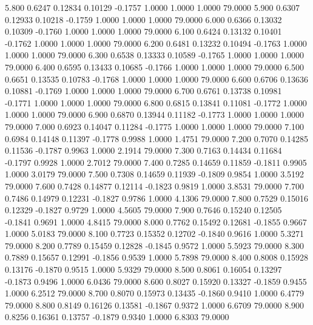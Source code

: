    5.800   0.6247   0.12834   0.10129  -0.1757   1.0000   1.0000   1.0000  79.0000
   5.900   0.6307   0.12933   0.10218  -0.1759   1.0000   1.0000   1.0000  79.0000
   6.000   0.6366   0.13032   0.10309  -0.1760   1.0000   1.0000   1.0000  79.0000
   6.100   0.6424   0.13132   0.10401  -0.1762   1.0000   1.0000   1.0000  79.0000
   6.200   0.6481   0.13232   0.10494  -0.1763   1.0000   1.0000   1.0000  79.0000
   6.300   0.6538   0.13333   0.10589  -0.1765   1.0000   1.0000   1.0000  79.0000
   6.400   0.6595   0.13433   0.10685  -0.1766   1.0000   1.0000   1.0000  79.0000
   6.500   0.6651   0.13535   0.10783  -0.1768   1.0000   1.0000   1.0000  79.0000
   6.600   0.6706   0.13636   0.10881  -0.1769   1.0000   1.0000   1.0000  79.0000
   6.700   0.6761   0.13738   0.10981  -0.1771   1.0000   1.0000   1.0000  79.0000
   6.800   0.6815   0.13841   0.11081  -0.1772   1.0000   1.0000   1.0000  79.0000
   6.900   0.6870   0.13944   0.11182  -0.1773   1.0000   1.0000   1.0000  79.0000
   7.000   0.6923   0.14047   0.11284  -0.1775   1.0000   1.0000   1.0000  79.0000
   7.100   0.6984   0.14148   0.11397  -0.1778   0.9988   1.0000   1.4751  79.0000
   7.200   0.7070   0.14285   0.11536  -0.1787   0.9963   1.0000   2.1914  79.0000
   7.300   0.7163   0.14434   0.11684  -0.1797   0.9928   1.0000   2.7012  79.0000
   7.400   0.7285   0.14659   0.11859  -0.1811   0.9905   1.0000   3.0179  79.0000
   7.500   0.7308   0.14659   0.11939  -0.1809   0.9854   1.0000   3.5192  79.0000
   7.600   0.7428   0.14877   0.12114  -0.1823   0.9819   1.0000   3.8531  79.0000
   7.700   0.7486   0.14979   0.12231  -0.1827   0.9786   1.0000   4.1306  79.0000
   7.800   0.7529   0.15016   0.12329  -0.1827   0.9729   1.0000   4.5605  79.0000
   7.900   0.7646   0.15240   0.12505  -0.1841   0.9691   1.0000   4.8415  79.0000
   8.000   0.7762   0.15492   0.12681  -0.1855   0.9667   1.0000   5.0183  79.0000
   8.100   0.7723   0.15352   0.12702  -0.1840   0.9616   1.0000   5.3271  79.0000
   8.200   0.7789   0.15459   0.12828  -0.1845   0.9572   1.0000   5.5923  79.0000
   8.300   0.7889   0.15657   0.12991  -0.1856   0.9539   1.0000   5.7898  79.0000
   8.400   0.8008   0.15928   0.13176  -0.1870   0.9515   1.0000   5.9329  79.0000
   8.500   0.8061   0.16054   0.13297  -0.1873   0.9496   1.0000   6.0436  79.0000
   8.600   0.8027   0.15920   0.13327  -0.1859   0.9455   1.0000   6.2512  79.0000
   8.700   0.8070   0.15973   0.13435  -0.1860   0.9410   1.0000   6.4779  79.0000
   8.800   0.8149   0.16126   0.13581  -0.1867   0.9372   1.0000   6.6709  79.0000
   8.900   0.8256   0.16361   0.13757  -0.1879   0.9340   1.0000   6.8303  79.0000
